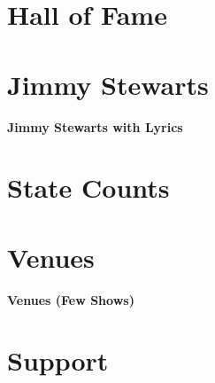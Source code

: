 \documentclass[8pt]{book}
\makeatletter
\let\mcnewpage=\newpage
\newcommand{\TrickSupertabularIntoMulticols}{
  \renewcommand\newpage{
    \if@firstcolumn
      \hrule width\linewidth height0pt
      \columnbreak
    \else
      \mcnewpage
    \fi
  }
}
\makeatother
\begin{document}
\chapter{Hall of Fame}

\begin{multicols*}{3}
\TrickSupertabularIntoMulticols

\end{multicols*}


\chapter{Jimmy Stewarts}

\begin{multicols*}{3}
\TrickSupertabularIntoMulticols

\begin{center}\Large{\textbf{Jimmy Stewarts with Lyrics}}\end{center}

\end{multicols*}


\chapter{State Counts}

\setlength{\tabcolsep}{5pt}
\begin{multicols*}{2}
\TrickSupertabularIntoMulticols

\end{multicols*}


\chapter{Venues}

\begin{multicols*}{3}
\TrickSupertabularIntoMulticols
\noindent

\end{multicols*}
\newpage
\begin{Large}\noindent\textbf{Venues (Few Shows)}\end{Large}


\chapter{Support}

\begin{multicols*}{3}
\TrickSupertabularIntoMulticols
\noindent

\end{multicols*}
\end{document}
